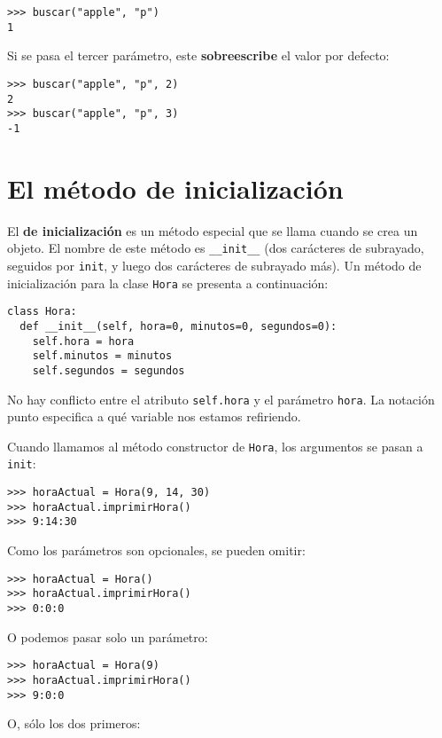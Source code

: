 \beforeverb
\begin{verbatim}
>>> buscar("apple", "p")
1
\end{verbatim}
\afterverb
%
Si se pasa el tercer parámetro, este {\bf sobreescribe} el valor
por defecto:

\beforeverb
\begin{verbatim}
>>> buscar("apple", "p", 2)
2
>>> buscar("apple", "p", 3)
-1
\end{verbatim}
\afterverb
%

\section{El método de inicialización}

El {\bf de inicialización} es un método especial que se llama
cuando se crea un objeto. El nombre de este método es \texttt{\_\_init\_\_} (dos
carácteres de subrayado, seguidos por \texttt{init}, y luego dos carácteres de subrayado más). 
Un método de inicialización para la clase  \texttt{Hora} se
presenta a continuación:

\beforeverb
\begin{verbatim}
class Hora:
  def __init__(self, hora=0, minutos=0, segundos=0):
    self.hora = hora
    self.minutos = minutos
    self.segundos = segundos
\end{verbatim}
\afterverb
%
No hay conflicto entre el  atributo \texttt{self.hora} y
el parámetro \texttt{hora}.  La notación punto especifica
a qué variable nos estamos refiriendo.


Cuando llamamos al método constructor de \texttt{Hora}, los argumentos se 
pasan a  \texttt{init}:

\beforeverb
\begin{verbatim}
>>> horaActual = Hora(9, 14, 30)
>>> horaActual.imprimirHora()
>>> 9:14:30
\end{verbatim}
\afterverb
%
Como los parámetros son opcionales, se pueden omitir:

\beforeverb
\begin{verbatim}
>>> horaActual = Hora()
>>> horaActual.imprimirHora()
>>> 0:0:0
\end{verbatim}
\afterverb
%
O podemos pasar solo un parámetro:

\beforeverb
\begin{verbatim}
>>> horaActual = Hora(9)
>>> horaActual.imprimirHora()
>>> 9:0:0
\end{verbatim}
\afterverb
%
O, sólo los dos primeros:

